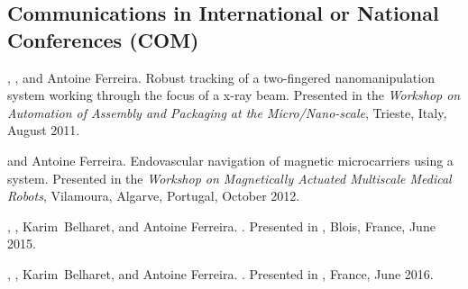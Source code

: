 \subsection[Communications in Conferences]{Communications in International or National Conferences (COM)}
\begin{Mybibliography}{10}
  \NAmari, \DavidFolio, and Antoine Ferreira.
  \newblock Robust tracking of a two-fingered nanomanipulation system working
  through the focus of a x-ray beam.
  \newblock Presented in the \emph{Workshop on Automation of Assembly and Packaging at
    the Micro/Nano-scale}, Trieste, Italy, August 2011.
  
  \DavidFolio and Antoine Ferreira.
  \newblock Endovascular navigation of magnetic microcarriers using a {\MRIshort}
  system.
  \newblock Presented in the \emph{Workshop on Magnetically Actuated Multiscale Medical
    Robots}, Vilamoura, Algarve, Portugal, October 2012.
  
  \LMellal, \DavidFolio, Karim~Belharet, and Antoine Ferreira.
  \newblock  {}.
  \newblock Presented in , Blois, France, June 2015.
  
  \LMellal, \DavidFolio, Karim~Belharet, and Antoine Ferreira.
  \newblock  {}.
  \newblock Presented in , France, June 2016.
  
\end{Mybibliography}

\endinput
